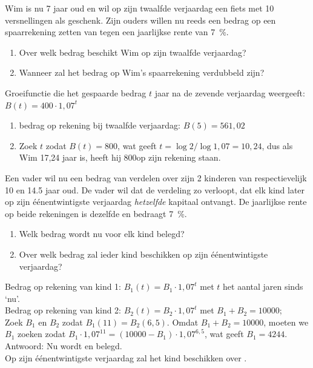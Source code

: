 \begin{oef}
Wim is nu 7 jaar oud en wil op zijn twaalfde
verjaardag een
fiets met 10 versnellingen als geschenk. Zijn ouders willen nu
reeds een bedrag op een spaarrekening zetten van  tegen een
jaarlijkse rente van \SI{7}{\percent}.
\begin{enumerate}
  \item Over welk bedrag beschikt Wim op zijn twaalfde verjaardag?
  \item Wanneer zal het bedrag op Wim's spaarrekening verdubbeld zijn?
\end{enumerate}
\begin{opl}
  Groeifunctie die het gespaarde bedrag $t$ jaar na de zevende verjaardag weergeeft: $B(t)=400\cdot 1,07^t$\\
  \begin{enumerate}
    \item bedrag op rekening bij twaalfde verjaardag: $B(5)=561,02$
    \item Zoek $t$ zodat $B(t)=800$, wat geeft $t=\log2/\log1,07=10,24$, dus als Wim 17,24 jaar is, heeft hij 800\euros op zijn rekening staan.
  \end{enumerate}
\end{opl}
\end{oef}



\begin{oef}
Een vader wil nu een bedrag van  verdelen over zijn
2 kinderen van respectievelijk 10 en \num{14,5} jaar oud. De vader wil
dat de verdeling zo verloopt, dat elk kind later op zijn
\'{e}\'{e}nentwintigste verjaardag \emph{hetzelfde} kapitaal ontvangt.
De jaarlijkse rente op beide rekeningen is dezelfde en bedraagt \SI{7}{\percent}.
\begin{enumerate}
  \item Welk bedrag wordt nu voor elk kind belegd?
  \item Over welk bedrag zal ieder kind beschikken op zijn
        \'e\'enentwintigste verjaardag?
\end{enumerate}
\begin{opl}
Bedrag op rekening van kind 1: $B_1(t)=B_1\cdot 1,07^t$ met $t$ het aantal jaren sinds `nu'.\\
Bedrag op rekening van kind 2: $B_2(t)=B_2\cdot 1,07^t$ met $B_1+B_2=\num{10000}$; \\
Zoek $B_1$ en $B_2$ zodat $B_1(11)=B_2(6,5)$. Omdat $B_1+B_2=\num{10000}$, moeten we $B_1$ zoeken zodat 
$B_1\cdot 1,07^{11}=(10000-B_1)\cdot 1,07^{6,5}$, wat geeft $B_1=4244$. \\
Antwoord: Nu wordt  en  belegd.\\
Op zijn  \'{e}\'{e}nentwintigste verjaardag zal het kind beschikken over .
\end{opl}
\end{oef}




